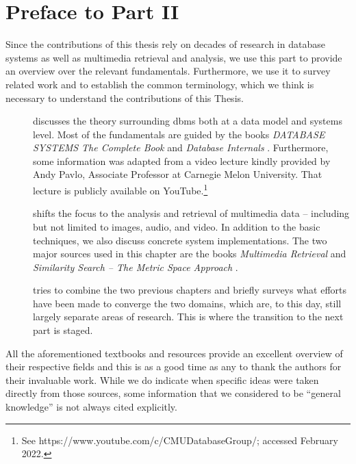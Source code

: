 \chapter*{Preface to Part II}

Since the contributions of this thesis rely on decades of research in database systems as well as multimedia retrieval and analysis, we use this part to provide an overview over the relevant fundamentals. Furthermore, we use it to survey related work and to establish the common terminology, which we think is necessary to understand the contributions of this Thesis.

\begin{description}
    \item[] discusses the theory surrounding \acrlong{dbms} both at a data model and systems level. Most of the fundamentals are guided by the books \emph{DATABASE SYSTEMS The Complete Book} \cite{Garcia:2009Database} and \emph{Database Internals} \cite{Petrov:2019Database}. Furthermore, some information was adapted from a video lecture kindly provided by Andy Pavlo, Associate Professor at Carnegie Melon University. That lecture is publicly available on YouTube.\footnote{See https://www.youtube.com/c/CMUDatabaseGroup/; accessed February 2022.}
    \item[] shifts the focus to the analysis and retrieval of multimedia data -- including but not limited to images, audio, and video. In addition to the basic techniques, we also discuss concrete system implementations. The two major sources used in this chapter are the books \emph{Multimedia Retrieval} \cite{Blanken:2007multimedia} and \emph{Similarity Search -- The Metric Space Approach} \cite{Zezula:2006Similarity}.
    \item[] tries to combine the two previous chapters and briefly surveys what efforts have been made to converge the two domains, which are, to this day, still largely separate areas of research. This is where the transition to the next part is staged.
\end{description}

All the aforementioned textbooks and resources provide an excellent overview of their respective fields and this is as a good time as any to thank the authors for their invaluable work. While we do indicate when specific ideas were taken directly from those sources, some information that we considered to be ``general knowledge'' is not always cited explicitly.